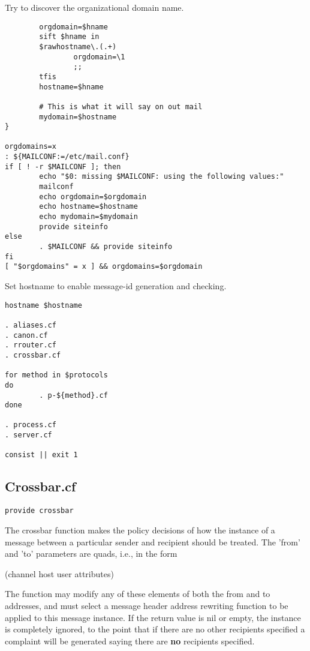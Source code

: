 Try to discover the organizational domain name.

\begin{verbatim}
        orgdomain=$hname
        sift $hname in
        $rawhostname\.(.+)
                orgdomain=\1
                ;;
        tfis
        hostname=$hname

        # This is what it will say on out mail
        mydomain=$hostname
}

orgdomains=x
: ${MAILCONF:=/etc/mail.conf}
if [ ! -r $MAILCONF ]; then
        echo "$0: missing $MAILCONF: using the following values:"
        mailconf
        echo orgdomain=$orgdomain
        echo hostname=$hostname
        echo mydomain=$mydomain
        provide siteinfo
else
        . $MAILCONF && provide siteinfo
fi
[ "$orgdomains" = x ] && orgdomains=$orgdomain
\end{verbatim}


Set hostname to enable message-id generation and checking.

\begin{verbatim}
hostname $hostname

. aliases.cf
. canon.cf
. rrouter.cf
. crossbar.cf

for method in $protocols
do
        . p-${method}.cf
done

. process.cf
. server.cf

consist || exit 1
\end{verbatim}





\subsection{Crossbar.cf}



\begin{verbatim}
provide crossbar
\end{verbatim}


The crossbar function makes the policy decisions of how the instance of
a message between a particular sender and recipient should be treated.
The 'from' and 'to' parameters are quads, i.e., in the form

(channel host user attributes)

The function may modify any of these elements of both the from and to
addresses, and must select a message header address rewriting function
to be applied to this message instance.  If the return value is nil or
empty, the instance is completely ignored, to the point that if there are
no other recipients specified a complaint will be generated saying there
are {\bf no} recipients specified.

